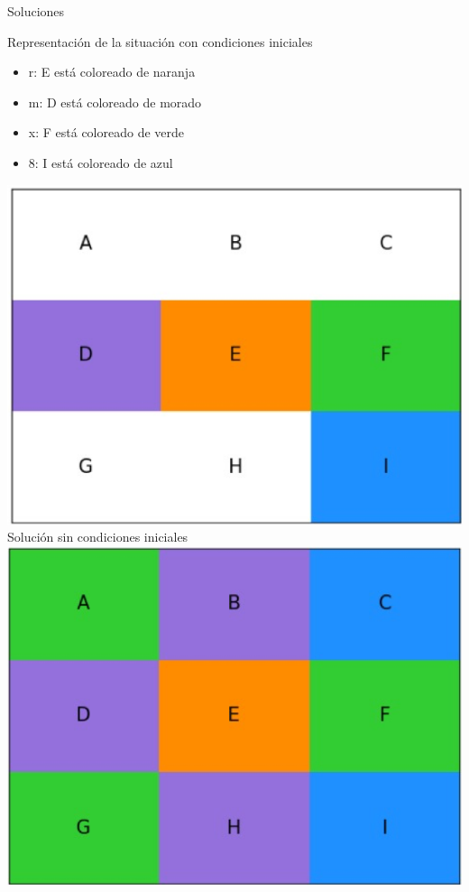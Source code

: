 \documentclass[10pt]{beamer}
\begin{document}
\begin{frame}{Soluciones}
\begin{multicols}{2}
Representación de la situación con condiciones iniciales \\
\begin{itemize}
\item r: E está coloreado de naranja
\item m: D está coloreado de morado
\item x: F está coloreado de verde
\item 8: I está coloreado de azul \\
\end{itemize}
\center
\includegraphics[scale=0.30]{Images/Picture1.png} \\
Solución sin condiciones iniciales \\
\center
\includegraphics[scale=0.35]{Images/Picture2.png}
\end{multicols}
\end{frame}
\end{document}
